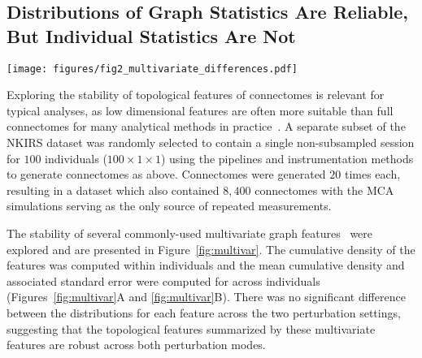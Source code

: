 \documentclass[fleqn,10pt]{SelfArx} %
\newcommand{\new}[1]{{#1}}
\begin{document}
\subsection*{Distributions of Graph Statistics Are Reliable, But Individual Statistics Are Not}
\begin{figure*}[bht!]\centering
\texttt{[image: figures/fig2\_multivariate\_differences.pdf]}
\caption{Distribution and stability assessment of multivariate graph statistics. (\textbf{A}, \textbf{B}) The
cumulative distribution functions of multivariate statistics across all subjects and perturbation settings. There was
no significant difference between the distributions in A and B. (\textbf{C}, \textbf{D}) The number of significant
digits in the first $5$ five moments of each statistic across perturbations. The dashed red line refers to the maximum
possible number of significant digits.}
\label{fig:multivar}
\end{figure*}

Exploring the stability of topological features of connectomes is relevant for typical analyses, as low dimensional
features are often more suitable than full connectomes for many analytical methods in practice~\cite{Rubinov2010-fh}.
A separate subset of the NKIRS dataset was randomly selected to contain a single non-subsampled session for $100$
individuals \new{($100 \times 1 \times 1$) using the pipelines and instrumentation methods to generate connectomes as
above. Connectomes were generated $20$ times each, resulting in a dataset which also contained $8,400$ connectomes with
the MCA simulations serving as the only source of repeated measurements.}

The stability of several commonly-used multivariate graph features~\cite{Betzel2018-eo} \new{were} explored \new{and
are presented} in Figure~\ref{fig:multivar}. The cumulative density of the features was computed within individuals and
the mean \new{cumulative} density and associated standard error were computed for across individuals
(Figures~\ref{fig:multivar}A and \ref{fig:multivar}B). There was no significant difference between the distributions
for each feature across the two perturbation settings, suggesting that the topological features summarized by these
multivariate features are robust across both perturbation modes.
\end{document}
